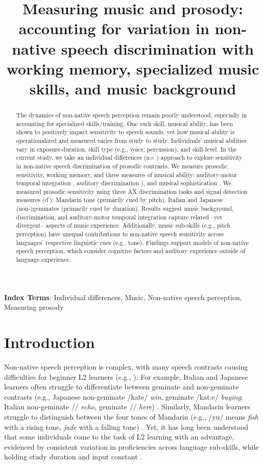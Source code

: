 \documentclass[a4paper]{article}
\title{Measuring music and prosody: accounting for variation in non-native speech discrimination with working memory, specialized music skills, and music background}
\newcommand{\livedata}[2]{%
    \DTLfetch{#1}{Statistic}{#2}{Value}%
}
\begin{document}
\maketitle
% 
\begin{abstract}
The dynamics of non-native speech perception remain poorly understood, especially in accounting for specialized skills/training. One such skill, musical ability, has been shown to positively impact sensitivity to speech sounds, yet how musical ability is operationalized and measured varies from study to study. Individuals’ musical abilities vary in exposure-duration, skill type (e.g., voice, percussion), and skill-level. In the current study, we take an individual differences (n=\livedata{partrem}{kept_participants}) approach to explore sensitivity in non-native speech discrimination of prosodic contrasts. We measure prosodic sensitivity, working memory, and three measures of musical ability: auditory-motor temporal integration \cite{Kachlicka_Saito_Tierney_2019}, auditory discrimination \cite[MET]{Wallentin_Nielsen_Friis-Olivarius_Vuust_Vuust_2010}), and musical sophistication \cite[Goldsmiths-MSI]{Müllensiefen_Gingras_Musil_Stewart_2014}. We measured prosodic sensitivity using three AX discrimination tasks and signal detection measures (d'): Mandarin tone (primarily cued by pitch), Italian and Japanese (non-)geminates (primarily cued by duration). Results suggest music background, discrimination, and auditory-motor temporal integration capture related –yet divergent– aspects of music experience. Additionally, music sub-skills (e.g., pitch perception) have unequal contributions to non-native speech sensitivity across languages' respective linguistic cues (e.g., tone). Findings support models of non-native speech perception, which consider cognitive factors and auditory experience outside of language experience.

\end{abstract}
\noindent\textbf{Index Terms}:  Individual differences, Music, Non-native speech perception, Measuring prosody
\noindent\section{Introduction}

Non-native speech perception is complex, with many speech contrasts causing difficulties for beginner L2 learners (e.g., \cite{Flege_95,Flege_2021}). For example, Italian and Japanese learners often struggle to differentiate between geminate and non-geminate contrasts (e.g., Japanese non-geminate /kate/ \textit{win}, geminate /kat:e/ \textit{buying}; Italian non-geminate // \textit{echo}, geminate // \textit{here}) \cite{Tsukada_Cox_Hajek_Hirata_2017}. Similarly, Mandarin learners struggle to distinguish between the four tones of Mandarin (e.g., /yu/ means \emph{fish} with a rising tone, \emph{jade} with a falling tone)  \cite{Pelzl_2021}. Yet, it has long been understood that some individuals come to the task of L2 learning with an advantage, evidenced by consistent variation in proficiencies across language sub-skills, while holding study duration and input constant \cite{Zheng_2021}. 
\end{document}
